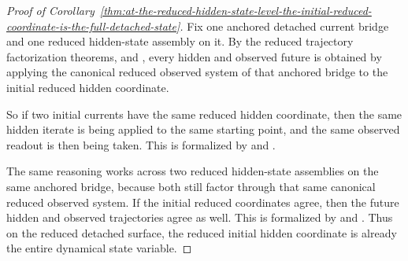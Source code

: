 \begin{proof}[Proof of Corollary~\ref{thm:at-the-reduced-hidden-state-level-the-initial-reduced-coordinate-is-the-full-detached-state}]
\label{proof:thm:at-the-reduced-hidden-state-level-the-initial-reduced-coordinate-is-the-full-detached-state}
Fix one anchored detached current bridge and one reduced hidden-state assembly
on it. By the reduced trajectory factorization theorems,
 and
, every
hidden and observed future is obtained by applying the canonical reduced
observed system of that anchored bridge to the initial reduced hidden
coordinate.

So if two initial currents have the same reduced hidden coordinate, then the
same hidden iterate is being applied to the same starting point, and the same
observed readout is then being taken. This is formalized by
and
.

The same reasoning works across two reduced hidden-state assemblies on the same
anchored bridge, because both still factor through that same canonical reduced
observed system. If the initial reduced coordinates agree, then the future
hidden and observed trajectories agree as well. This is formalized by
and
.
Thus on the reduced detached surface, the reduced initial hidden coordinate is
already the entire dynamical state variable.
\end{proof}


